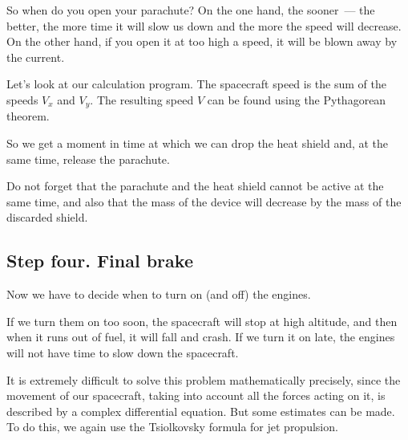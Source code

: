 \documentclass[12pt,a4paper]{article}
\begin{document}
So when do you open your parachute? On the one hand, the sooner~--- the better, the more time it will slow us down and the more the speed will decrease. On the other hand, if you open it at too high a speed, it will be blown away by the current.

Let's look at our calculation program. The spacecraft speed is the sum of the speeds $V_x$ and $V_y$. The resulting speed $V$ can be found using the Pythagorean theorem.

\hfill

\noindent{}

\hfill

So we get a moment in time at which we can drop the heat shield and, at the same time, release the parachute.

\hfill

\noindent{}

\hfill

Do not forget that the parachute and the heat shield cannot be active at the same time, and also that the mass of the device will decrease by the mass of the discarded shield.
\hfill

\noindent{}

\subsection{Step four. Final brake}

Now we have to decide when to turn on (and off) the engines.

If we turn them on too soon, the spacecraft will stop at high altitude, and then when it runs out of fuel, it will fall and crash. If we turn it on late, the engines will not have time to slow down the spacecraft.

It is extremely difficult to solve this problem mathematically precisely, since the movement of our spacecraft, taking into account all the forces acting on it, is described by a complex differential equation. But some estimates can be made. To do this, we again use the Tsiolkovsky formula for jet propulsion.
\end{document}
